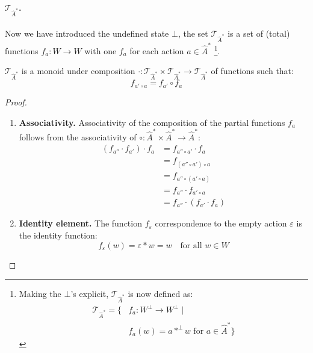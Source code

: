 \paragraph{$\mathcal{T}_{\hat{A}^{\ast}}$.}
Now we have introduced the undefined state $\bot$, the set $\mathcal{T}_{\hat{A}^{\ast}}$ is a set of (total) functions $f_{a}: W \to W$ with one $f_{a}$ for each action $a \in \hat{A}^{\ast}$ \footnote{
Making the $\bot$'s explicit, $\mathcal{T}_{\hat{A}^{\ast}}$ is now defined as:
\begin{equation}
	\begin{aligned}
		\mathcal{T}_{\hat{A}^{\ast}} = \{ & f_{a}: W^{\bot} \to W^{\bot} \mid                                \\
		                                  & f_{a}(w) = a \ast^{\bot} w \text{ for $a \in \hat{A}^{\ast}$} \}
	\end{aligned}
\end{equation}
}.

\begin{proposition}\label{prp:T_is_monoid}
	$\mathcal{T}_{\hat{A}^{\ast}}$ is a monoid under composition $\cdot: \mathcal{T}_{\hat{A}^{\ast}} \times \mathcal{T}_{\hat{A}^{\ast}} \to \mathcal{T}_{\hat{A}^{\ast}}$ of functions such that:
	\begin{equation}
		f_{a' \circ a} = f_{a'} \circ f_{a}
	\end{equation}
\end{proposition}
\begin{proof}
	\begin{enumerate}
		\item \textbf{Associativity.}
		      Associativity of the composition of the partial functions $f_{a}$ follows from the associativity of $\circ: \hat{A}^{\ast} \times \hat{A}^{\ast} \to \hat{A}^{\ast}$:
		      \begin{align}
			      (f_{a''} \cdot f_{a'}) \cdot f_{a} & = f_{a'' \circ a'} \cdot f_{a}       \\
			                                         & = f_{(a'' \circ a') \circ a}         \\
			                                         & = f_{a'' \circ (a' \circ a)}         \\
			                                         & = f_{a''} \cdot f_{a' \circ a}       \\
			                                         & = f_{a''} \cdot (f_{a'} \cdot f_{a})
		      \end{align}
		\item \textbf{Identity element.}
		      The function $f_{\varepsilon}$ correspondence to the empty action $\varepsilon$ is the identity function:
		      \begin{equation}
			      f_{\varepsilon}(w) = \varepsilon \ast w = w \quad \text{for all $w \in W$}
		      \end{equation}
	\end{enumerate}
\end{proof}

